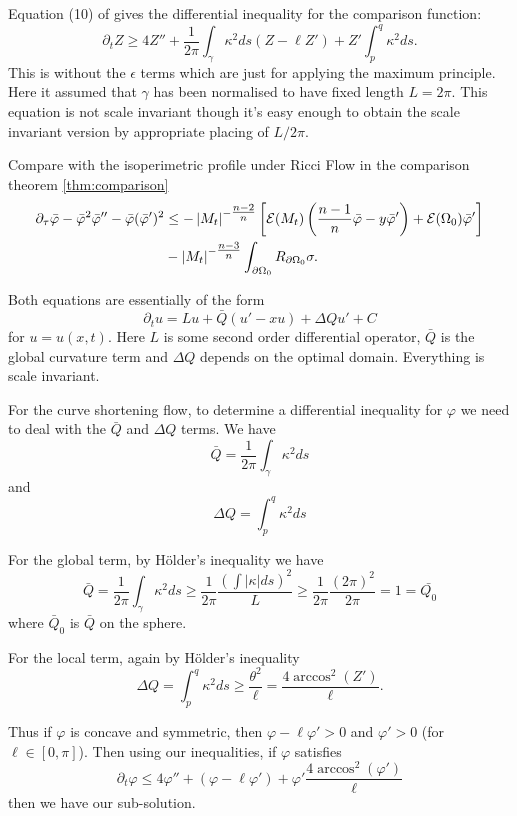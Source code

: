 \documentclass{amsart}
\begin{document}
Equation (10) of \cite{AndrewsBryan:01/2011} gives the differential inequality for the comparison function:
\[
\partial_t Z \geq 4 Z'' + \frac{1}{2\pi} \int_{\gamma} \kappa^2 ds (Z - \ell Z') + Z'\int_p^q \kappa^2 ds.
\]
This is without the \(\epsilon\) terms which are just for applying the maximum principle. Here it assumed that \(\gamma\) has been normalised to have fixed length \(L = 2\pi\). This equation is not scale invariant though it's easy enough to obtain the scale invariant version by appropriate placing of \(L/2\pi\).

Compare with the isoperimetric profile under Ricci Flow in the comparison theorem \ref{thm:comparison}
\[
\begin{split}
\partial_{\tau} \bar{\varphi} - \bar{\varphi}^2 \bar{\varphi}'' - \bar{\varphi}(\bar{\varphi}')^2 &\leq -\left|{M_t}\right|^{-\tfrac{n-2}{n}} \left[\operatorname{\mathcal{E}}(M_t)\left(\frac{n-1}{n} \bar{\varphi} - y \bar{\varphi}'\right) + \operatorname{\mathcal{E}}(\Omega_0)\bar{\varphi}'\right] \\
&- \left|{M_t}\right|^{-\tfrac{n-3}{n}}\int_{\partial {\Omega_0}} R_{\partial {\Omega_0}}\sigma.
\end{split}
\]

Both equations are essentially of the form
\[
\partial_t u = L u + \bar{Q} (u' - x u) + \Delta Q u' + C
\]
for \(u = u(x, t)\). Here \(L\) is some second order differential operator, \(\bar{Q}\) is the global curvature term and \(\Delta Q\) depends on the optimal domain. Everything is scale invariant.

For the curve shortening flow, to determine a differential inequality for \(\varphi\) we need to deal with the \(\bar{Q}\) and \(\Delta Q\) terms. We have
\[
\bar{Q} = \frac{1}{2\pi}\int_{\gamma} \kappa^2 ds
\]
and
\[
\Delta Q = \int_p^q \kappa^2 ds
\]

For the global term, by H\"older's inequality we have
\[
\bar{Q} = \frac{1}{2\pi} \int_{\gamma} \kappa^2 ds \geq \frac{1}{2\pi} \frac{\left(\int |\kappa| ds\right)^2}{L} \geq \frac{1}{2\pi} \frac{(2\pi)^2}{2\pi} = 1 = \bar{Q_0}
\]
where \(\bar{Q}_0\) is \(\bar{Q}\) on the sphere.

For the local term, again by H\"older's inequality
\[
\Delta Q = \int_p^q \kappa^2 ds \geq \frac{\theta^2}{\ell} = \frac{4 \arccos^2(Z')}{\ell}.
\]

Thus if \(\varphi\) is concave and symmetric, then \(\varphi - \ell \varphi' > 0\) and \(\varphi' > 0\) (for \(\ell \in [0, \pi]\)). Then using our inequalities, if \(\varphi\) satisfies
\[
\partial_t \varphi \leq 4 \varphi'' + (\varphi - \ell \varphi') + \varphi' \frac{4 \arccos^2(\varphi')}{\ell}
\]
then we have our sub-solution.
\end{document}
